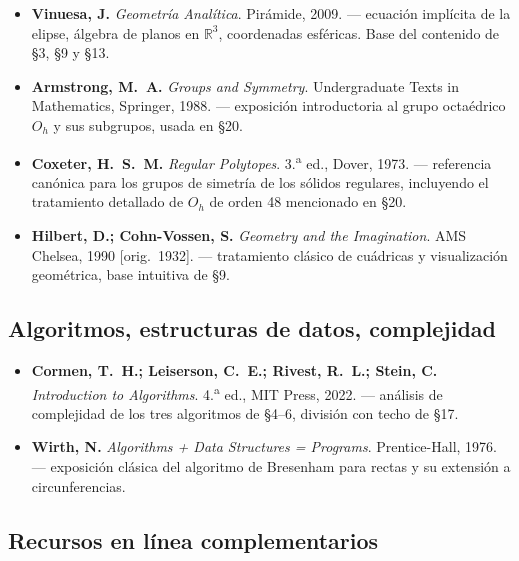 \documentclass[12pt,a4paper]{scrartcl}
\begin{document}
\begin{itemize}[leftmargin=1.4em,itemsep=0.3em,topsep=0.3em]
  \item \textbf{Vinuesa, J.} \emph{Geometría Analítica}. Pirámide, 2009.
        --- ecuación implícita de la elipse, álgebra de planos en $\mathbb{R}^3$,
        coordenadas esféricas. Base del contenido de §3, §9 y §13.

  \item \textbf{Armstrong, M.~A.} \emph{Groups and Symmetry}. Undergraduate Texts in
        Mathematics, Springer, 1988.
        --- exposición introductoria al grupo octaédrico $O_h$ y sus subgrupos, usada en §20.

  \item \textbf{Coxeter, H.~S.~M.} \emph{Regular Polytopes}. 3.\textsuperscript{a} ed., Dover, 1973.
        --- referencia canónica para los grupos de simetría de los sólidos regulares, incluyendo el tratamiento detallado de $O_h$ de orden 48 mencionado en §20.

  \item \textbf{Hilbert, D.; Cohn-Vossen, S.} \emph{Geometry and the Imagination}.
        AMS Chelsea, 1990 [orig.~1932].
        --- tratamiento clásico de cuádricas y visualización geométrica, base intuitiva de §9.
\end{itemize}

\subsection*{Algoritmos, estructuras de datos, complejidad}

\begin{itemize}[leftmargin=1.4em,itemsep=0.3em,topsep=0.3em]
  \item \textbf{Cormen, T.~H.; Leiserson, C.~E.; Rivest, R.~L.; Stein, C.}
        \emph{Introduction to Algorithms}. 4.\textsuperscript{a} ed., MIT Press, 2022.
        --- análisis de complejidad de los tres algoritmos de §4--6, división con techo de §17.

  \item \textbf{Wirth, N.} \emph{Algorithms + Data Structures = Programs}.
        Prentice-Hall, 1976.
        --- exposición clásica del algoritmo de Bresenham para rectas y su extensión a circunferencias.
\end{itemize}

\subsection*{Recursos en línea complementarios}
\end{document}
